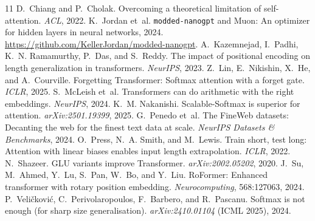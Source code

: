 \documentclass[10pt]{article}
\begin{document}
\vspace{6pt}
\begingroup
\small
\setlength{\itemsep}{2.5pt}\setlength{\parskip}{0pt}
\begin{thebibliography}{11}
 D.~Chiang and P.~Cholak. Overcoming a theoretical limitation of self-attention. \emph{ACL}, 2022.
 K.~Jordan et~al. \texttt{modded-nanogpt} and Muon: An optimizer for hidden layers in neural networks, 2024. \url{https://github.com/KellerJordan/modded-nanogpt}.
 A.~Kazemnejad, I.~Padhi, K.~N. Ramamurthy, P.~Das, and S.~Reddy. The impact of positional encoding on length generalization in transformers. \emph{NeurIPS}, 2023.
 Z.~Lin, E.~Nikishin, X.~He, and A.~Courville. Forgetting Transformer: Softmax attention with a forget gate. \emph{ICLR}, 2025.
 S.~McLeish et~al. Transformers can do arithmetic with the right embeddings. \emph{NeurIPS}, 2024.
 K.~M. Nakanishi. Scalable-Softmax is superior for attention. \emph{arXiv:2501.19399}, 2025.
 G.~Penedo et~al. The FineWeb datasets: Decanting the web for the finest text data at scale. \emph{NeurIPS Datasets \& Benchmarks}, 2024.
 O.~Press, N.~A. Smith, and M.~Lewis. Train short, test long: Attention with linear biases enables input length extrapolation. \emph{ICLR}, 2022.
 N.~Shazeer. GLU variants improve Transformer. \emph{arXiv:2002.05202}, 2020.
 J.~Su, M.~Ahmed, Y.~Lu, S.~Pan, W.~Bo, and Y.~Liu. RoFormer: Enhanced transformer with rotary position embedding. \emph{Neurocomputing}, 568:127063, 2024.
 P.~Veli{\v{c}}kovi{\'c}, C.~Perivolaropoulos, F.~Barbero, and R.~Pascanu. Softmax is not enough (for sharp size generalisation). \emph{arXiv:2410.01104} (ICML 2025), 2024.
\end{thebibliography}
\endgroup
\end{document}
